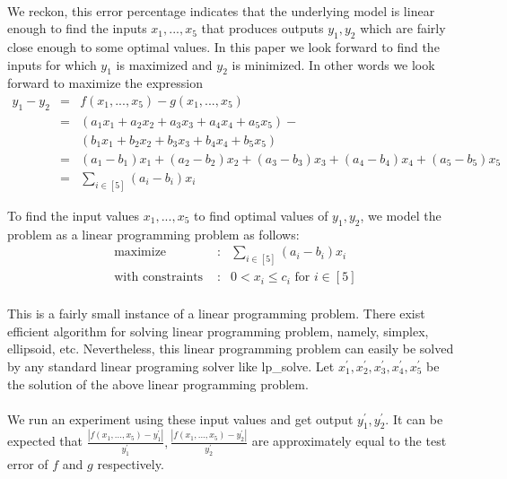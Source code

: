 \documentclass[12pt]{article}
\begin{document}
\paragraph{}
We reckon, this error percentage indicates that the underlying model is linear enough to find the inputs $x_1,...,x_5$ that produces outputs $y_1,y_2$ which are fairly close enough to some optimal values. In this paper we look forward to find the inputs for which $y_1$ is maximized and $y_2$ is minimized. In other words we look forward to maximize the expression
\begin{eqnarray*}
y_1 - y_2 &=& f(x_1,...,x_5) - g(x_1,...,x_5)\\
&=& (a_1x_1 + a_2x_2 + a_3x_3 + a_4x_4 + a_5x_5) - \\ & &(b_1x_1 + b_2x_2 + b_3x_3 + b_4x_4 + b_5x_5)\\
&=& (a_1 - b_1)x_1 + (a_2 - b_2)x_2 + (a_3 - b_3)x_3 + (a_4 - b_4)x_4 + (a_5 - b_5)x_5\\
&=& \sum_{i \in [5]} (a_i-b_i)x_i
\end{eqnarray*}

To find the input values $x_1,...,x_5$ to find optimal values of $y_1,y_2$, we model the problem as a linear programming problem as follows:
\begin{eqnarray*}
\text{ maximize } &:& \sum_{i \in [5]} (a_i-b_i)x_i \\
\text{ with constraints } &:& 0 < x_i \leq c_i \text{ for } i \in [5]\\
\end{eqnarray*} 


This is a fairly small instance of a linear programming problem. There exist efficient algorithm for solving linear programming problem, namely, simplex, ellipsoid, etc. Nevertheless, this linear programming problem can easily be solved by any standard linear programing solver like lp\_solve. Let $x_1^{'},x_2^{'},x_3^{'},x_4^{'},x_5^{'}$ be the solution of the above linear programming problem. 

\paragraph{}
We run an experiment using these input values and get output $y_1^{'},y_2^{'}$. It can be expected that $\frac{|f(x_1,...,x_5)-y_1^{'}|}{y_1^{'}}, \frac{|f(x_1,...,x_5)-y_2^{'}|}{y_2^{'}}$ are approximately equal to the test error of $f$ and $g$ respectively.
\end{document}
